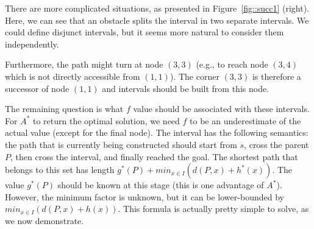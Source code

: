 There are more complicated situations, 
as presented in Figure~\ref{fig::succ1} (right).  
Here, we can see that an obstacle splits the interval 
in two separate intervals.  
We could define disjunct intervals, 
but it seems more natural to consider them independently.  

Furthermore, the path might turn at node $(3,3)$
(e.g., to reach node $(3,4)$
which is not directly accessible from $(1,1)$).  
The corner $(3,3)$ is therefore a successor of node $(1,1)$ 
and intervals should be built from this node.  


The remaining question is what $f$ value 
should be associated with these intervals.  
For $A^*$ to return the optimal solution, 
we need $f$ to be an underestimate of the actual value 
(except for the final node).  
The interval has the following semantics: 
the path that is currently being constructed 
should start from $s$, cross the parent $P$, 
then cross the interval, and finally reached the goal.  
The shortest path that belongs to this set 
has length $g^*(P) + min_{x \in I}(d(P,x) + h^*(x))$.  
The value $g^*(P)$ should be known at this stage 
(this is one advantage of $A^*$).  
However, the minimum factor is unknown, 
but it can be lower-bounded by $min_{x \in I}(d(P,x) + h(x))$.  
This formula is actually pretty simple to solve, as we now demonstrate.  

